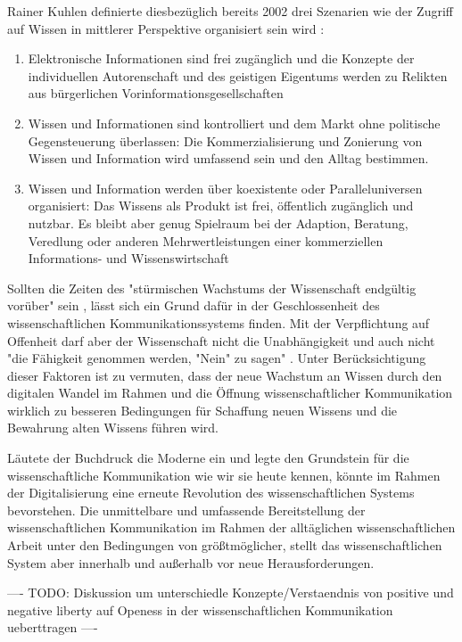 Rainer Kuhlen definierte diesbezüglich bereits 2002 drei Szenarien wie der Zugriff auf Wissen in mittlerer Perspektive organisiert sein wird \cite{Kuhlen_2002_universalaccess}:
\begin{enumerate}
\item Elektronische Informationen sind frei zugänglich und die Konzepte der individuellen Autorenschaft und des geistigen Eigentums werden zu Relikten aus bürgerlichen Vorinformationsgesellschaften
\item Wissen und Informationen sind kontrolliert und dem Markt ohne politische Gegensteuerung überlassen: Die Kommerzialisierung und Zonierung von Wissen und Information wird umfassend sein und den Alltag bestimmen.
\item Wissen und Information werden über koexistente oder Paralleluniversen organisiert: Das Wissens als Produkt ist frei, öffentlich zugänglich und nutzbar. Es bleibt aber genug Spielraum bei der Adaption, Beratung, Veredlung oder anderen Mehrwertleistungen einer kommerziellen Informations- und Wissenswirtschaft
\end{enumerate}

Sollten die Zeiten des "stürmischen Wachstums der Wissenschaft endgültig vorüber" sein \cite{K_lbel_2002}, lässt sich ein Grund dafür in der Geschlossenheit des wissenschaftlichen Kommunikationssystems finden. Mit der Verpflichtung auf Offenheit darf aber der Wissenschaft nicht die Unabhängigkeit und auch nicht "die Fähigkeit genommen werden, "Nein" zu sagen" \cite{suchen_Hornbostel_2006}. Unter Berücksichtigung dieser Faktoren ist zu vermuten, dass der neue Wachstum an Wissen durch den digitalen Wandel im Rahmen und die Öffnung wissenschaftlicher Kommunikation wirklich zu besseren Bedingungen für Schaffung neuen Wissens und die Bewahrung alten Wissens führen wird.

Läutete der Buchdruck die Moderne ein und legte den Grundstein für die wissenschaftliche Kommunikation wie wir sie heute kennen, könnte im Rahmen der Digitalisierung eine erneute Revolution des wissenschaftlichen Systems bevorstehen. Die unmittelbare und umfassende Bereitstellung der wissenschaftlichen Kommunikation im Rahmen der alltäglichen wissenschaftlichen Arbeit unter den Bedingungen von größtmöglicher, stellt das wissenschaftlichen System aber innerhalb und außerhalb vor neue Herausforderungen.

---- TODO: Diskussion um unterschiedle Konzepte/Verstaendnis von positive und negative liberty \cite{kelty_2014_freedom} auf Openess in der wissenschaftlichen Kommunikation ueberttragen ----


